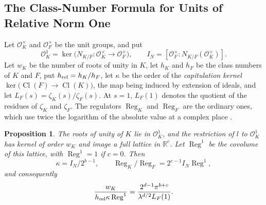 \documentclass[11pt]{amsart}
\numberwithin{equation}{section}
\newtheorem{proposition}[equation]{Proposition}
\theoremstyle{definition}
\theoremstyle{remark}
\DeclareMathOperator{\Cl}{Cl}
\newcommand{\R}{\mathbb R}
\begin{document}
\subsection{The Class-Number Formula for Units of Relative Norm One}

Let $\mathcal O_K^\times$ and $\mathcal O_F^\times$ be the unit groups,
and put
\[
 \mathcal O_K^1=\ker\bigl(N_{K/F}\colon\mathcal O_K^\times\to
 \mathcal O_F^\times\bigr),
 \qquad I_N=[\mathcal O_F^\times:N_{K/F}(\mathcal O_K^\times)].
\]
Let $w_K$ be the number of roots of unity in $K$, let $h_K$ and $h_F$ be
the class numbers of $K$ and $F$, put $h_{\rm rel}=h_K/h_F$, let $\kappa$
be the order of the \emph{capitulation kernel}
$\ker\bigl(\Cl(F)\to\Cl(K)\bigr)$, the map being induced by extension of
ideals, and let
$L_F(s)=\zeta_K(s)/\zeta_F(s)$. At $s=1$, $L_F(1)$ denotes the quotient
of the residues of $\zeta_K$ and $\zeta_F$. The regulators
$\operatorname{Reg}_K$ and $\operatorname{Reg}_F$ are the ordinary ones,
which use twice the logarithm of the absolute value at a complex place
\cite[Chapter~5]{MilneANT}.

\begin{proposition}\label{geo:mass}
The roots of unity of $K$ lie in $\mathcal O_K^1$, and the restriction of
$l$ to $\mathcal O_K^1$ has kernel of order $w_K$ and image a full
lattice in $\R^c$. Let $\operatorname{Reg}^1$ be the covolume of this
lattice, with $\operatorname{Reg}^1=1$ if $c=0$. Then
\[
 \kappa=I_N/2^{b-1},\qquad
 \operatorname{Reg}_K/\operatorname{Reg}_F=2^{c-1}I_N\operatorname{Reg}^1,
\]
and consequently
\begin{equation}\label{geo:mass-density}
 \frac{w_K}{h_{\rm rel}\kappa\operatorname{Reg}^1}
 =\frac{2^{d-1}\pi^{b+c}}{\lambda^{d/2}L_F(1)}.
\end{equation}
\end{proposition}
\end{document}
